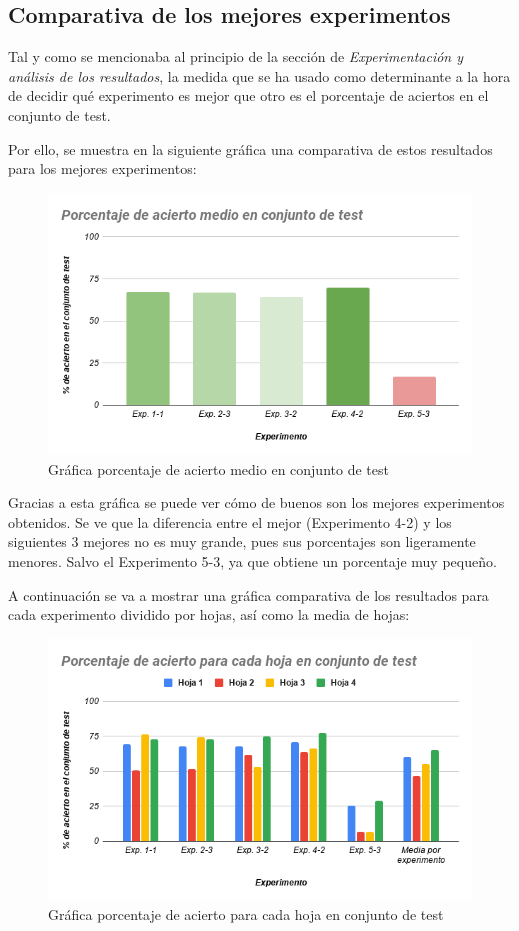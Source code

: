 \documentclass{uc3mpracticas}
\begin{document}
\subsection{Comparativa de los mejores experimentos}

Tal y como se mencionaba al principio de la sección de  \textit{Experimentación y análisis de los resultados}, la medida que se ha usado como determinante a la hora de decidir qué experimento es mejor que otro es el porcentaje de aciertos en el conjunto de test.

\vspace{2mm}

Por ello, se muestra en la siguiente gráfica una comparativa de estos resultados para los mejores experimentos:

\begin{figure}[!h]
\centering
  \includegraphics[width=.7\linewidth]{Images/p_acierto_medio_test.png}
  \caption*{Gráfica porcentaje de acierto medio en conjunto de test}
\end{figure}

Gracias a esta gráfica se puede ver cómo de buenos son los mejores experimentos obtenidos. Se ve que la diferencia entre el mejor (Experimento 4-2) y los siguientes 3 mejores no es muy grande, pues sus porcentajes son ligeramente menores. Salvo el Experimento 5-3, ya que obtiene un porcentaje muy pequeño.

\vspace{2mm}

A continuación se va a mostrar una gráfica comparativa de los resultados para cada experimento dividido por hojas, así como la media de hojas:

\begin{figure}[!h]
\centering
  \includegraphics[width=.7\linewidth]{Images/p_acierto_cada_hoja_test.png}
  \caption*{Gráfica porcentaje de acierto para cada hoja en conjunto de test}
\end{figure}
\end{document}
